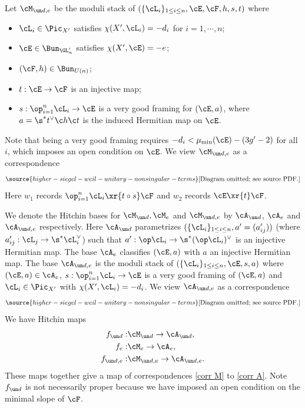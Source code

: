 Let $\cM_{\un d,e}$ be the  moduli stack of $(\{\cL_{i}\}_{1\le i\le n}, \cE, \cF,h,s,t)$ where
\begin{itemize}
\item $\cL_{i}\in \Pic_{X'}$ satisfies $\chi(X',\cL_{i})=-d_{i}$ for $i=1,\cdots, n$;
\item $\cE\in \Bun_{\GL_n'}$ satisfies $\chi(X',\cE)=-e$;
\item $(\cF,h)\in \Bun_{U(n)}$;
\item $t: \cE\to \cF$ is an injective map;
\item $s: \op_{i=1}^{n}\cL_{i}\to\cE$ is a very good framing for $(\cE,a)$, where $a=\s^{*}t^{\vee}\c h\c t$ is the induced Hermitian map on $\cE$.
\end{itemize}
Note that being a very good framing requires $-d_{i}<\mu_{\min}(\cE)-(3g'-2)$ for all $i$, which imposes an open condition on $\cE$.  We view $\cM_{\un d,e}$ as a correspondence
\begin{equation}\label{corr M}
\source{higher-siegel-weil-unitary-nonsingular-terms}
\text{[Diagram omitted; see source PDF.]}
\end{equation}
Here $w_{1}$ records $\op_{i=1}^{n}\cL_{i}\xr{t\circ s}\cF$ and $w_{2}$ records $\cE\xr{t}\cF$.

We denote the Hitchin bases for $\cM_{\un d}, \cM_{e}$ and $\cM_{\un d,e}$ by $\cA_{\un d}$,  $\cA_{e}$ and $\cA_{\un d,e}$ respectively. Here $\cA_{\un d}$ parametrizes $(\{\cL_{i}\}_{1\le i\le n},a'=(a'_{ij}))$ (where $a'_{ij}: \cL_{j}\to \s^{*}\cL_{i}^{\vee}$) such that $a':\op\cL_{i}\to \s^{*}(\op\cL_{i})^{\vee}$ is an injective Hermitian map.  The base $\cA_{e}$ classifies $(\cE, a)$ with $a$ an injective Hermitian map. The base $\cA_{\un d,e}$ is the moduli stack of $(\{\cL_{i}\}_{1\le i\le n}, \cE, s,a)$ where  $(\cE,a)\in \cA_{e}$, $s: \op_{i=1}^{n}\cL_{i}\to\cE$ is a very good framing of $(\cE,a)$ and $\cL_{i}\in \Pic_{X'}$ with $\chi(X',\cL_{i})=-d_{i}$.  We view $\cA_{\un d,e}$ as a correspondence
\begin{equation}\label{corr A}
\source{higher-siegel-weil-unitary-nonsingular-terms}
\text{[Diagram omitted; see source PDF.]}
\end{equation}
We have Hitchin maps
\begin{eqnarray*}
f_{\un d}: &\cM_{\un d}\to \cA_{\un d},\\
f_{e}: &\cM_{e}\to \cA_{e},\\
f_{\un d, e}: &\cM_{\un d, e}\to \cA_{\un d,e}.
\end{eqnarray*}
These maps together give a map of correspondences \eqref{corr M} to \eqref{corr A}. Note $f_{\un d}$ is not necessarily proper because we have imposed an open condition on the minimal slope of $\cF$.

